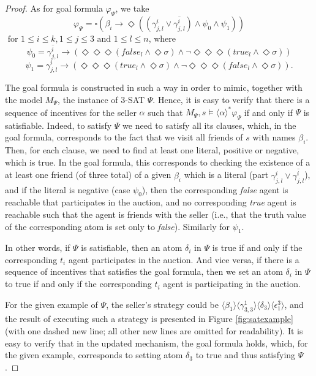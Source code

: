 \documentclass[letterpaper]{article} %
\theoremstyle{definition}
\begin{document}
\begin{proof}
As for goal formula $\varphi_\Psi$, we take $$\varphi_\Psi = \square %
\left( \beta_i \to \Diamond %
\left((\gamma^i_{j,l} \lor \overline{\gamma^i_{j,l}}) \land \psi_0 \land \psi_1\right)\right)$$
$\text{ for } 1\leqslant i \leqslant k, 1 \leqslant j \leqslant 3 \text { and } 1 \leqslant l \leqslant n$,
where $$\psi_0 = \overline{\gamma^i_{j,l}} \to (\Diamond \Diamond \Diamond (%
false_l \land \Diamond \sigma) \land \lnot \Diamond \Diamond \Diamond (%
true_l \land \Diamond \sigma))$$ $$\psi_1 = \gamma^i_{j,l} \to (\Diamond \Diamond \Diamond (%
true_l \land \Diamond \sigma) \land  \lnot \Diamond \Diamond \Diamond (%
false_l \land \Diamond \sigma)).$$

The goal formula is constructed in such a way in order to mimic, together with the model $M_\Psi$, the instance of 3-SAT $\Psi$. Hence, it is easy to verify that there is a sequence of incentives for the seller $\alpha$ such that $M_\Psi, s \models \langle \alpha \rangle^\ast \varphi_\Psi$ if and only if $\Psi$ is satisfiable. Indeed, to satisfy $\Psi$ we need to satisfy all its clauses, which, in the goal formula, corresponds to the fact that we visit all friends of $s$ with names $\beta_i$. Then, for each clause, we need to find at least one literal, positive or negative, which is true. In the goal formula, this corresponds to checking the existence of a at least one friend (of three total) of a given $\beta_i$ which is a literal (part $\gamma^i_{j,l} \lor \overline{\gamma^i_{j,l}}$), and if the literal is negative (case $\psi_0$), then the corresponding \textit{false} agent is reachable that participates in the auction, and no corresponding \textit{true} agent is reachable such that the agent is friends with the seller (i.e., that the truth value of the corresponding atom is set only to \textit{false}). Similarly for $\psi_1$. 

In other words, if $\Psi$ is satisfiable, then an atom $\delta_i$ in $\Psi$ is true if and only if the corresponding $t_i$ agent participates in the auction. And vice versa, if there is a sequence of incentives that satisfies the goal formula, then we set an atom $\delta_i$ in $\Psi$ to true if and only if the corresponding $t_i$ agent is participating in the auction.  

For the given example of $\Psi$, the seller's strategy could be $\langle \beta_1\rangle \langle \gamma^1_{3,3} \rangle \langle \delta_3 \rangle \langle \epsilon_1^3 \rangle$, and the result of executing such a strategy is presented in Figure \ref{fig:satexample} (with one dashed new line; all other new lines are omitted for readability). It is easy to verify that in the updated mechanism, the goal formula holds, which, for the given example, corresponds to setting atom $\delta_3$ to true and thus satisfying $\Psi$.
\end{proof}
\fi
\end{document}
